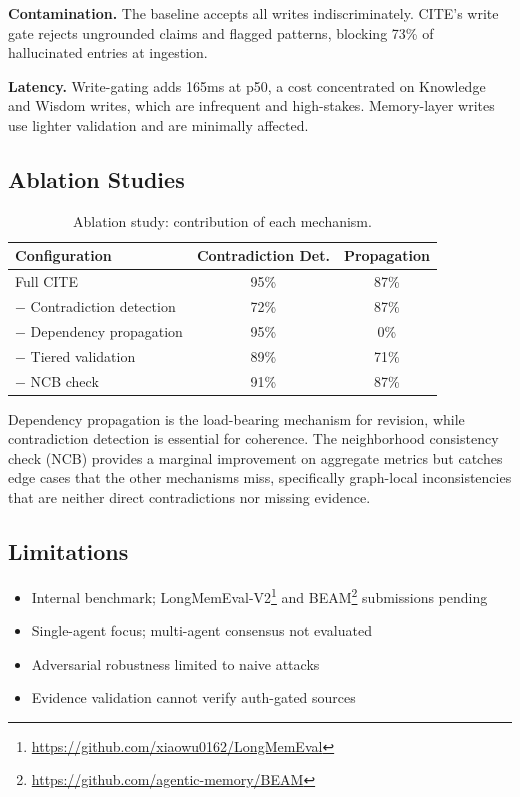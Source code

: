\documentclass[11pt,letterpaper]{article}
\begin{document}
\textbf{Contamination.} The baseline accepts all writes indiscriminately. CITE's write gate rejects ungrounded claims and flagged patterns, blocking 73\% of hallucinated entries at ingestion.

\textbf{Latency.} Write-gating adds 165ms at p50, a cost concentrated on Knowledge and Wisdom writes, which are infrequent and high-stakes. Memory-layer writes use lighter validation and are minimally affected.

\subsection{Ablation Studies}

\begin{table}[H]
\centering
\caption{Ablation study: contribution of each mechanism.}
\label{tab:ablation}
\begin{tabular}{@{}lcc@{}}
\toprule
\textbf{Configuration} & \textbf{Contradiction Det.} & \textbf{Propagation} \\
\midrule
Full CITE & 95\% & 87\% \\
$-$ Contradiction detection & 72\% & 87\% \\
$-$ Dependency propagation & 95\% & 0\% \\
$-$ Tiered validation & 89\% & 71\% \\
$-$ NCB check & 91\% & 87\% \\
\bottomrule
\end{tabular}
\end{table}

Dependency propagation is the load-bearing mechanism for revision, while contradiction detection is essential for coherence. The neighborhood consistency check (NCB) provides a marginal improvement on aggregate metrics but catches edge cases that the other mechanisms miss, specifically graph-local inconsistencies that are neither direct contradictions nor missing evidence.

\subsection{Limitations}

\begin{itemize}[noitemsep]
    \item Internal benchmark; LongMemEval-V2\footnote{\url{https://github.com/xiaowu0162/LongMemEval}} and BEAM\footnote{\url{https://github.com/agentic-memory/BEAM}} submissions pending
    \item Single-agent focus; multi-agent consensus not evaluated
    \item Adversarial robustness limited to naive attacks
    \item Evidence validation cannot verify auth-gated sources
\end{itemize}
\end{document}
